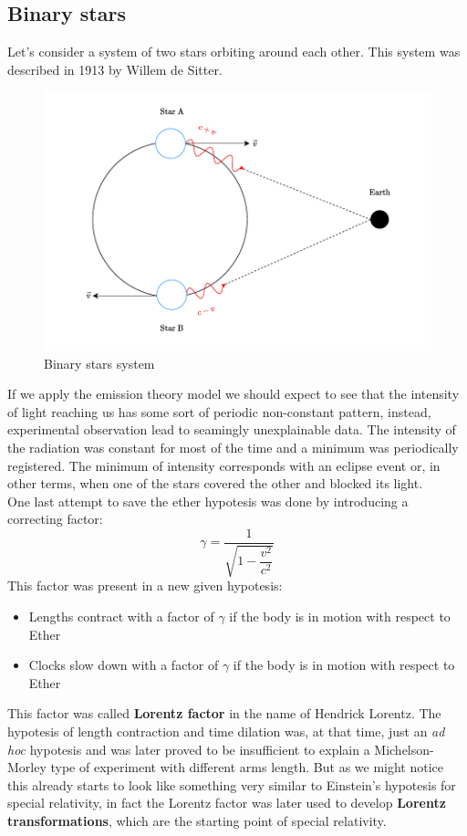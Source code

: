 \subsection{Binary stars}
Let's consider a system of two stars orbiting around each other. This system was described in 1913 by  Willem de Sitter.
\begin{figure}[H]
  \centering
  \includegraphics[width=0.6\linewidth]{res/svg/binary_stars.drawio}
  \caption{Binary stars system}
\end{figure}
If we apply the emission theory model we should expect to see that the intensity of light reaching us has some sort of periodic non-constant pattern, instead, experimental observation lead to seamingly unexplainable data. The intensity of the radiation was constant for most of the time and a minimum was periodically registered. The minimum of intensity corresponds with an eclipse event or, in other terms, when one of the stars covered the other and blocked its light.\\
One last attempt to save the ether hypotesis was done by introducing a correcting factor:
\begin{equation}
  \gamma = \dfrac{1}{\sqrt{1-\dfrac{v^2}{c^2}}}
\end{equation}
This factor was present in a new given hypotesis:
\begin{itemize}
  \item Lengths contract with a factor of $\gamma$ if the body is in motion with respect to Ether
  \item Clocks slow down with a factor of $\gamma$ if the body is in motion with respect to Ether
\end{itemize}
This factor was called \textbf{Lorentz factor} in the name of Hendrick Lorentz. The hypotesis of length contraction and time dilation was, at that time, just an \textit{ad hoc} hypotesis and was later proved to be insufficient to explain a Michelson-Morley type of experiment with different arms length. But as we might notice this already starts to look like something very similar to Einstein's hypotesis for special relativity, in fact the Lorentz factor was later used to develop \textbf{Lorentz transformations}, which are the starting point of special relativity.
